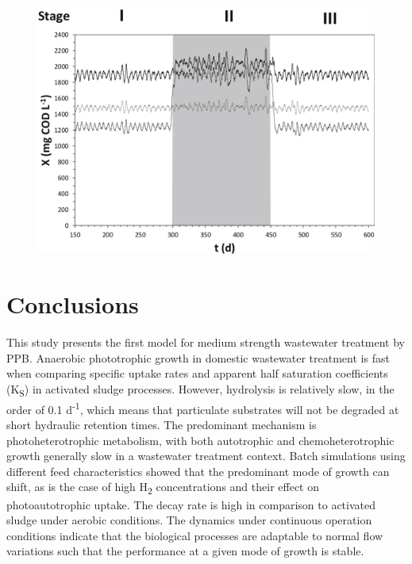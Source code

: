 \begin{figure}[tp]
    \centering
    \includegraphics[width=1\linewidth,height=\textheight,keepaspectratio]{./Chap2/simulations/dynamic_biomass.jpg}
    \caption{}
    \label{fig:ch2_dyn_bio}
\end{figure}

\section{Conclusions}
This study presents the first model for medium strength wastewater treatment by PPB.
Anaerobic phototrophic growth in domestic wastewater treatment is fast when comparing specific uptake rates and apparent half saturation coefficients (K\textsubscript{S}) in activated sludge processes. However, hydrolysis is relatively slow, in the order of 0.1 d\textsuperscript{-1}, which means that particulate substrates will not be degraded at short hydraulic retention times. The predominant mechanism is photoheterotrophic metabolism, with both autotrophic and chemoheterotrophic growth generally slow in a wastewater treatment context. Batch simulations using different feed characteristics showed that the predominant mode of growth can shift, as is the case of high H\textsubscript{2} concentrations and their effect on photoautotrophic uptake. The decay rate is high in comparison to activated sludge under aerobic conditions. The dynamics under continuous operation conditions indicate that the biological processes are adaptable to normal flow variations such that the performance at a given mode of growth is stable. 

